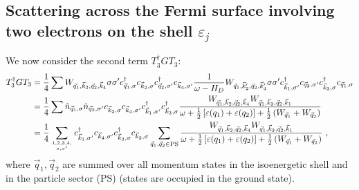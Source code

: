 \documentclass{revtex4-2}
\begin{document}
\subsection{Scattering across the Fermi surface involving two electrons on the shell \(\varepsilon_j\)}
We now consider the second term \(T_3^\dagger G T_3\):
\begin{equation}\begin{aligned}
	T_3^\dagger G T_3 &= \frac{1}{4}\sum W_{\vec q_1,\vec k_2, \vec q_2, \vec k_4} \sigma\sigma^\prime c^\dagger_{\vec q_1,\sigma}c_{\vec k_2,\sigma}c^\dagger_{\vec q_2,\sigma^\prime}c_{\vec k_4,\sigma^\prime} \frac{1}{\omega - H_D} W_{\vec q_1,\vec k_2^\prime, \vec q_2, \vec k_4^\prime} \sigma\sigma^\prime c^\dagger_{\vec k_1,\sigma^\prime} c_{\vec q_2,\sigma^\prime} c^\dagger_{\vec k_3,\sigma} c_{\vec q_1,\sigma}\\
			  &= \frac{1}{4}\sum  \hat n_{\vec q_1,\sigma} \hat n_{\vec q_2,\sigma^\prime} c_{\vec k_2,\sigma} c_{\vec k_4,\sigma^\prime} c^\dagger_{\vec k_1,\sigma^\prime} c^\dagger_{\vec k_3,\sigma} \frac{W_{\vec q_1,\vec k_2, \vec q_2, \vec k_4} W_{\vec q_1,\vec k_3, \vec q_2, \vec k_1}}{\omega + \frac{1}{2}\left[\varepsilon(q_1) + \varepsilon(q_2)\right] + \frac{1}{2}\left(W_{\vec q_1} + W_{\vec q_2}\right)}\\
			  &= \frac{1}{4}\sum_{1,2,3,4,\atop{\sigma,\sigma^\prime}} c^\dagger_{\vec k_1,\sigma^\prime} c_{\vec k_4,\sigma^\prime} c^\dagger_{\vec k_3,\sigma}c_{\vec k_2,\sigma}  \sum_{\vec q_1, \vec q_2 \in \text{PS}}\frac{W_{\vec q_1,\vec k_2, \vec q_2, \vec k_4} W_{\vec q_1,\vec k_3, \vec q_2, \vec k_1}}{\omega + \frac{1}{2}\left[\varepsilon(q_1) + \varepsilon(q_2)\right] + \frac{1}{2}\left(W_{\vec q_1} + W_{\vec q_2}\right)}~,
\end{aligned}\end{equation}
where \(\vec q_1, \vec q_2\) are summed over all momentum states in the isoenergetic shell and in the particle sector (PS) (states are occupied in the ground state).
\end{document}
